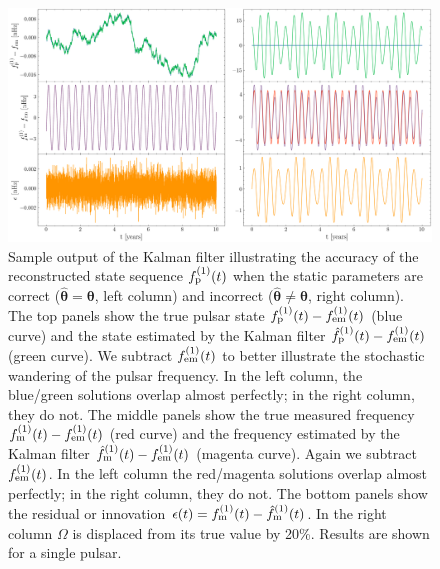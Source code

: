 \documentclass[fleqn,usenatbib,useAMS]{mnras}
\begin{document}
\begin{figure}
	\includegraphics[width=\textwidth, height =0.5\textwidth]{images/Kalman_example_both}
	\caption{Sample output of the Kalman filter illustrating the accuracy of the reconstructed state sequence $f_{\rm p}^{(1)}(t)$ when the static parameters are correct (${\boldsymbol{\hat\theta}} = {\boldsymbol{\theta}}$, left column) and incorrect (${\boldsymbol{\hat\theta}} \neq {\boldsymbol{\theta}}$, right column). The top panels show the true pulsar state $f_{\rm p}^{(1)}(t) - f_{\rm em}^{(1)}(t)$ (blue curve) and the state estimated by the Kalman filter $\hat{f}_{\rm p}^{(1)}(t) - f_{\rm em}^{(1)}(t)$  (green curve). We subtract $f_{\rm em}^{(1)}(t)$ to better illustrate the stochastic wandering of the pulsar frequency. In the left column, the blue/green solutions overlap almost perfectly; in the right column, they do not. The middle panels show the true measured frequency $f_{\rm m}^{(1)}(t) - f_{\rm em}^{(1)}(t)$ (red curve) and the frequency estimated  by the Kalman filter $\hat{f}_{\rm m}^{(1)}(t) - f_{\rm em}^{(1)}(t)$ (magenta curve). Again we subtract $f_{\rm em}^{(1)}(t)$. In the left column the red/magenta solutions overlap almost perfectly; in the right column, they do not. The bottom panels show the residual or innovation $\epsilon(t) =f_{\rm m}^{(1)}(t) - \hat{f}_{\rm m}^{(1)}(t)$. In the right column $\Omega$ is displaced from its true value by 20\%. Results are shown for a single pulsar. } 
	\label{fig:kalman_example}
\end{figure}
\end{document}
